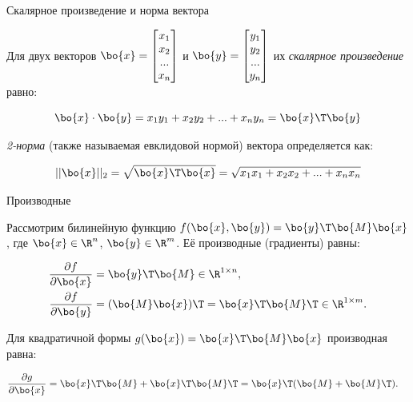 \documentclass{beamer}
\begin{document}
\begin{frame}{Скалярное произведение и норма вектора}
	\begin{flushleft}
		
		Для двух векторов $\bo{x} = \begin{bmatrix}
			x_1 \\ x_2 \\ ... \\ x_n
		\end{bmatrix}$ и $\bo{y} = \begin{bmatrix}
			y_1 \\ y_2 \\ ... \\ y_n
		\end{bmatrix}$ их \emph{скалярное произведение} равно:
		
		\begin{equation}
			\bo{x} \cdot \bo{y} = x_1 y_1 + x_2 y_2 + ... + x_n y_n = \bo{x}\T \bo{y}
		\end{equation}
		
		\emph{2-норма} (также называемая евклидовой нормой) вектора определяется как:
		
		\begin{equation}
			||\bo{x}||_2 = \sqrt{\bo{x}\T \bo{x}} =  \sqrt{x_1 x_1 + x_2 x_2 + ... + x_n x_n}
		\end{equation}
		
		
	\end{flushleft}
\end{frame}





\begin{frame}{Производные}
	\begin{flushleft}
		
		Рассмотрим билинейную функцию $f(\bo{x}, \bo{y}) = \bo{y}\T \bo{M} \bo{x}$, где $\bo{x} \in \R^n$,  $\bo{y} \in \R^m$. Её производные (градиенты) равны:
		
		\begin{align}
			\frac{\partial f}{\partial \bo{x}} &= \bo{y}\T \bo{M} \in \R^{1 \times n}, 
			\\
			\frac{\partial f}{\partial \bo{y}} &= ( \bo{M} \bo{x})\T =  \bo{x}\T \bo{M}\T \in \R^{1 \times m}.
		\end{align}
		
		Для квадратичной формы $g(\bo{x}) = \bo{x}\T \bo{M} \bo{x}$ производная равна:
		
		\begin{align}
			\frac{\partial g}{\partial \bo{x}} &= \bo{x}\T \bo{M} + \bo{x}\T \bo{M}\T = \bo{x}\T (\bo{M} + \bo{M}\T).
		\end{align}
		
		
	\end{flushleft}
\end{frame}
\end{document}
